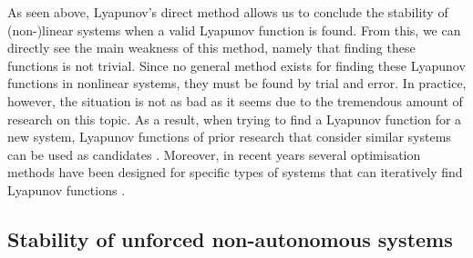 As seen above, Lyapunov's direct method allows us to conclude the stability of (non-)linear systems when a valid Lyapunov function is found. From this, we can directly see the main weakness of this method, namely that finding these functions is not trivial. Since no general method exists for finding these Lyapunov functions in nonlinear systems, they must be found by trial and error. In practice, however, the situation is not as bad as it seems due to the tremendous amount of research on this topic. As a result, when trying to find a Lyapunov function for a new system, Lyapunov functions of prior research that consider similar systems can be used as candidates \cite{haddadNonlinearDynamicalSystems2011}. Moreover, in recent years several optimisation methods have been designed for specific types of systems that can iteratively find Lyapunov functions \cite{khalilNonlinearSystems2002,gieslReviewComputationalMethods2015,ravanbakhshLearningControlLyapunov2019}.

\subsection{Stability of unforced non-autonomous systems}

